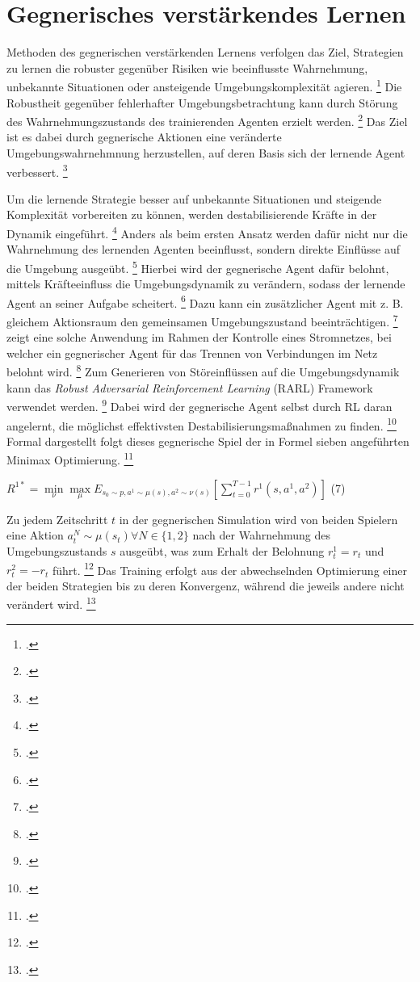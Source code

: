 \section{Gegnerisches verstärkendes Lernen}
Methoden des gegnerischen verstärkenden Lernens verfolgen das Ziel, Strategien zu lernen die robuster gegenüber Risiken wie beeinflusste Wahrnehmung, unbekannte Situationen oder ansteigende Umgebungskomplexität agieren. \footcite[Vgl.][S. 2]{Schott.2022}
Die Robustheit gegenüber fehlerhafter Umgebungsbetrachtung kann durch Störung des Wahrnehmungszustands des trainierenden Agenten erzielt werden. \footcite[Vgl.][S. 2]{Schott.2022}
Das Ziel ist es dabei durch gegnerische Aktionen eine veränderte Umgebungswahrnehmnung herzustellen, auf deren Basis sich der lernende Agent verbessert. \footcite[Vgl.][S. 3]{Schott.2022}

Um die lernende Strategie besser auf unbekannte Situationen und steigende Komplexität vorbereiten zu können, werden destabilisierende Kräfte in der Dynamik eingeführt. \footcite[Vgl.][S. 1]{Pinto.2017}
Anders als beim ersten Ansatz werden dafür nicht nur die Wahrnehmung des lernenden Agenten beeinflusst, sondern direkte Einflüsse auf die Umgebung ausgeübt. \footcite[Vgl.][S. 2]{Schott.2022}
Hierbei wird der gegnerische Agent dafür belohnt, mittels Kräfteeinfluss die Umgebungsdynamik zu verändern, sodass der lernende Agent an seiner Aufgabe scheitert. \footcite[Vgl.][S. 2]{Pinto.2017}
Dazu kann ein zusätzlicher Agent mit z. B. gleichem Aktionsraum den gemeinsamen Umgebungszustand beeinträchtigen. \footcite[Vgl.][S. 2]{Pinto.2017}
\cite[]{Pan.2021} zeigt eine solche Anwendung im Rahmen der Kontrolle eines Stromnetzes, bei welcher ein gegnerischer Agent für das Trennen von Verbindungen im Netz belohnt wird. \footcite[Vgl.][S. 2]{Pan.2021}
Zum Generieren von Störeinflüssen auf die Umgebungsdynamik kann das \textit{Robust Adversarial Reinforcement Learning} (RARL) Framework verwendet werden. \footcite[Vgl.][S. 2]{Schott.2022}
Dabei wird der gegnerische Agent selbst durch RL daran angelernt, die möglichst effektivsten Destabilisierungsmaßnahmen zu finden. \footcite[Vgl.][S. 1]{Pinto.2017}
Formal dargestellt folgt dieses gegnerische Spiel der in Formel sieben angeführten Minimax Optimierung. \footcite[Vgl.][S. 3]{Pinto.2017}
\begin{description}
    \item \begin{center} $R^{1*} = \underset{\nu}{\min}\underset{\mu}{\max} E_{s_{0}\sim p,a^{1}\sim\mu(s),a^{2}\sim\nu(s)} [\sum_{t=0}^{T-1} r^{1} (s,a^{1},a^{2})]$ (7)\end{center} 
\end{description}
Zu jedem Zeitschritt $t$ in der gegnerischen Simulation wird von beiden Spielern eine Aktion $a_{t}^{N} \sim \mu(s_{t}) \forall N \in \{1,2\}$ nach der Wahrnehmung des Umgebungszustands $s$ ausgeübt, was zum Erhalt der Belohnung $r_{t}^{1} = r_{t}$ und $r_{t}^{2} = -r_{t}$ führt. \footcite[Vgl.][S. 3f.]{Pinto.2017}
Das Training erfolgt aus der abwechselnden Optimierung einer der beiden Strategien bis zu deren Konvergenz, während die jeweils andere nicht verändert wird. \footcite[Vgl.][S. 4]{Pinto.2017}

